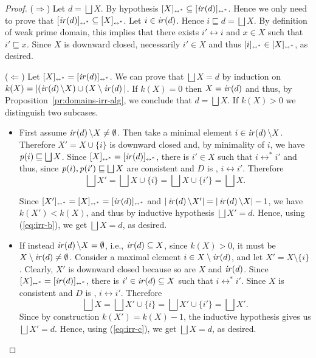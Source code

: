 \begin{proof}
  ($\Rightarrow$) Let $d = \bigsqcup X$. By hypothesis
  $[{X}]_{\scriptscriptstyle {\leftrightarrow^*}} \subseteq [{\mathop{\mathit{ir}({d})}}]_{\scriptscriptstyle {\leftrightarrow^*}}$. Hence we only need to
  prove that $[{\mathop{\mathit{ir}({d})}}]_{\scriptscriptstyle {\leftrightarrow^*}} \subseteq [{X}]_{\scriptscriptstyle {\leftrightarrow^*}}$. Let $i \in
  \mathop{\mathit{ir}({d})}$. Hence $i \sqsubseteq d = \bigsqcup X$. By definition of
  weak prime domain, this implies that there exists
  $i' \leftrightarrow i$ and $x \in X$ such that $i' \sqsubseteq
  x$. Since $X$ is downward closed, necessarily $i' \in X$ and thus
  $[{i}]_{\scriptscriptstyle {\leftrightarrow^*}} \in [{X}]_{\scriptscriptstyle {\leftrightarrow^*}}$, as desired.

  \bigskip

  ($\Leftarrow$) Let $[{X}]_{\scriptscriptstyle {\leftrightarrow^*}} = [{\mathop{\mathit{ir}({d})}}]_{\scriptscriptstyle {\leftrightarrow^*}}$. We can
  prove that $\bigsqcup X = d$ by induction on
  $k(X) = |(\mathop{\mathit{ir}({d})} \setminus X) \cup (X \setminus \mathop{\mathit{ir}({d})}|$. If $k(X)=0$ then $X = \mathop{\mathit{ir}({d})}$ and thus, by
  Proposition~\ref{pr:domains-irr-alg}, we conclude that
  $d = \bigsqcup X$.
  If $k(X) > 0$ we distinguish two subcases.
  \begin{itemize}
  \item First assume
  $\mathop{\mathit{ir}({d})} \setminus X \neq \emptyset$. Then take a minimal element
  $i \in \mathop{\mathit{ir}({d})} \setminus X$. Therefore $X' = X \cup \{ i \}$ is
  downward closed and, by minimality of $i$, we have
  $\mathit{p}({i}) \sqsubseteq \bigsqcup X$. Since
  $[{X}]_{\scriptscriptstyle {\leftrightarrow^*}} = [{\mathop{\mathit{ir}({d})}}]_{\scriptscriptstyle {\leftrightarrow^*}}$, there is $i' \in X$ such that
  $i \leftrightarrow^* i'$ and thus, since
  $\mathit{p}({i}), \mathit{p}({i'}) \sqsubseteq \bigsqcup X$ are consistent and $D$
  is {\wi}, $i \leftrightarrow i'$.  
  Therefore
  \begin{equation}
    \label{eq:irr-b}
    \bigsqcup X' = \bigsqcup X \cup \{ i \} = \bigsqcup X \cup \{ i' \}
    = \bigsqcup X.
  \end{equation}
  
  Since $[{X'}]_{\scriptscriptstyle {\leftrightarrow^*}} =  [{X}]_{\scriptscriptstyle {\leftrightarrow^*}}  =  [{\mathop{\mathit{ir}({d})}}]_{\scriptscriptstyle {\leftrightarrow^*}}$ and
  $|\mathop{\mathit{ir}({d})} \setminus X'| = |\mathop{\mathit{ir}({d})} \setminus X| -1$, we have
  $k(X') < k(X)$, and thus by inductive hypothesis $\bigsqcup X' =
  d$. Hence, using (\ref{eq:irr-b}), we get $\bigsqcup X = d$, as
  desired.
  
\item If instead $\mathop{\mathit{ir}({d})} \setminus X = \emptyset$, i.e.,
  $\mathop{\mathit{ir}({d})} \subseteq X$, since $k(X)>0$, it must be
  $X \setminus \mathop{\mathit{ir}({d})} \neq \emptyset$. Consider a maximal element
  $i \in X \setminus \mathop{\mathit{ir}({d})}$, and let $X' = X \setminus \{i\}$. Clearly, $X'$ is downward closed because so are $X$ and $\mathop{\mathit{ir}({d})}$.  Since
  $[{X}]_{\scriptscriptstyle {\leftrightarrow^*}} = [{\mathop{\mathit{ir}({d})}}]_{\scriptscriptstyle {\leftrightarrow^*}}$, there is
  $i' \in \mathop{\mathit{ir}({d})} \subseteq X$ such that $i \leftrightarrow^* i'$. Since $X$ is consistent and $D$ is {\wi}, $i \leftrightarrow i'$. Therefore
    \begin{equation}
    \label{eq:irr-c}
    \bigsqcup X = \bigsqcup X' \cup \{ i \} = \bigsqcup X' \cup \{ i' \}
    = \bigsqcup X'.
  \end{equation}
  Since by construction $k(X') = k(X)-1$, the inductive hypothesis
  gives us $\bigsqcup X'=d$. Hence, using (\ref{eq:irr-c}), we get
  $\bigsqcup X = d$, as desired.
  \end{itemize}
\end{proof}


